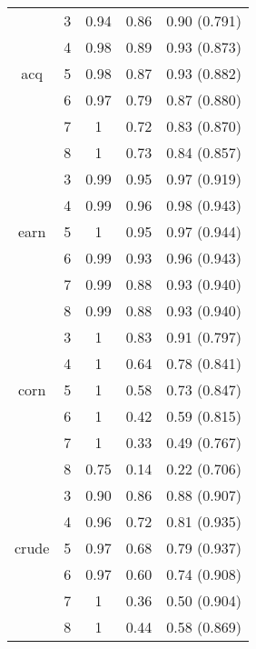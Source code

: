 \begin{table}[]
{\begin{tabular}{| c | c | c | c | c | }
		& 3 & 0.94 & 0.86 & 0.90 (0.791)    \\ 
		& 4 & 0.98 & 0.89 &  0.93 (0.873)   \\
		acq	& 5 & 0.98 & 0.87 & 0.93  (0.882)   \\ 
		& 6 & 0.97 & 0.79 & 0.87  (0.880)   \\
		& 7 & 1 & 0.72 & 0.83  (0.870)   \\
		& 8 & 1 & 0.73 & 0.84  (0.857)   \\
		\hline
		
		
		
		& 3 & 0.99 & 0.95 &  0.97 (0.919)   \\ 
		& 4 & 0.99 & 0.96 &  0.98 (0.943)   \\ 
		earn & 5 & 1 & 0.95 &  0.97  (0.944)  \\ 
		& 6 & 0.99 & 0.93 &  0.96  (0.943)  \\ 
		& 7 & 0.99 & 0.88 &  0.93  (0.940)  \\ 
		& 8 & 0.99 & 0.88 &  0.93  (0.940)  \\ \hline
		
		
		
		& 3 & 1 & 0.83 & 0.91  (0.797)   \\ 
		& 4 & 1 & 0.64 & 0.78  (0.841)   \\ 
		corn	& 5 & 1 & 0.58 &  0.73 (0.847)   \\ 
		& 6 & 1 & 0.42 & 0.59  (0.815)   \\ 
		& 7 & 1 & 0.33 & 0.49  (0.767)  \\ 
		& 8 & 0.75 & 0.14 & 0.22  (0.706)   \\ \hline
		
		
		& 3 & 0.90 & 0.86 &  0.88  (0.907)  \\ 
		& 4 & 0.96 & 0.72 & 0.81  (0.935)   \\ 
		crude & 5 & 0.97 & 0.68 &  0.79 (0.937)   \\ 
		& 6 & 0.97 & 0.60 &  0.74 (0.908)   \\
		& 7 & 1 & 0.36 &  0.50 (0.904)   \\
		& 8 & 1 & 0.44 &  0.58  (0.869)  \\ \hline
		
		
		
	\end{tabular}} 

\end{table}
